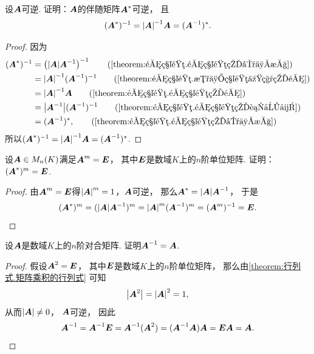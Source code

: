 \begin{example}\label{theorem:逆矩阵.伴随矩阵的逆与逆矩阵的伴随}
设\(\boldsymbol{A}\)可逆.
证明：\(\boldsymbol{A}\)的伴随矩阵\(\boldsymbol{A}^*\)可逆，
且\begin{equation}
	(\boldsymbol{A}^*)^{-1}
	= \abs{\boldsymbol{A}}^{-1} \boldsymbol{A}
	= (\boldsymbol{A}^{-1})^*.
\end{equation}
\begin{proof}
因为\begin{align*}
	(\vb{A}^*)^{-1}
	&= \left( \DeterminantA{\vb{A}} \vb{A}^{-1} \right)^{-1}
		\tag{\cref{theorem:逆矩阵.逆矩阵的唯一性}} \\
	&= \DeterminantA{\vb{A}}^{-1} (\vb{A}^{-1})^{-1}
		\tag{\cref{theorem:逆矩阵.数与矩阵乘积的逆}} \\
	&= \DeterminantA{\vb{A}}^{-1} \vb{A}
		\tag{\cref{theorem:逆矩阵.逆矩阵的逆}} \\
	&= \DeterminantA{\vb{A}^{-1}} (\vb{A}^{-1})^{-1}
		\tag{\cref{theorem:逆矩阵.逆矩阵的行列式}} \\
	&= (\vb{A}^{-1})^*,
		\tag{\cref{theorem:逆矩阵.逆矩阵的唯一性}}
\end{align*}
所以\((\boldsymbol{A}^*)^{-1}
= \abs{\boldsymbol{A}}^{-1} \boldsymbol{A}
= (\boldsymbol{A}^{-1})^*\).
\end{proof}
\end{example}
\begin{example}
设\(\boldsymbol{A} \in M_n(K)\)满足\(\boldsymbol{A}^m = \boldsymbol{E}\)，
其中\(\boldsymbol{E}\)是数域\(K\)上的\(n\)阶单位矩阵.
证明：\((\boldsymbol{A}^*)^m = \boldsymbol{E}\).
\begin{proof}
由\(\boldsymbol{A}^m = \boldsymbol{E}\)得\(\abs{\boldsymbol{A}}^m = 1\)，\(\boldsymbol{A}\)可逆，
那么\(\boldsymbol{A}^* = \abs{\boldsymbol{A}} \boldsymbol{A}^{-1}\)，
于是\begin{equation*}
	(\boldsymbol{A}^*)^m
	= (\abs{\boldsymbol{A}} \boldsymbol{A}^{-1})^m
	= \abs{\boldsymbol{A}}^m (\boldsymbol{A}^{-1})^m
	= (\boldsymbol{A}^m)^{-1}
	= \boldsymbol{E}.
	\qedhere
\end{equation*}
\end{proof}
\end{example}

\begin{example}\label{example:对合矩阵.对合矩阵的逆矩阵}
设\(\boldsymbol{A}\)是数域\(K\)上的\(n\)阶对合矩阵.
证明\(\boldsymbol{A}^{-1} = \boldsymbol{A}\).
\begin{proof}
假设\(\boldsymbol{A}^2=\boldsymbol{E}\)，
其中\(\boldsymbol{E}\)是数域\(K\)上的\(n\)阶单位矩阵，
那么由\cref{theorem:行列式.矩阵乘积的行列式} 可知\begin{equation*}
	\abs{\boldsymbol{A}^2}
	= \abs{\boldsymbol{A}}^2
	= 1,
\end{equation*}
从而\(\abs{\boldsymbol{A}}\neq0\)，
\(\boldsymbol{A}\)可逆，
因此\begin{equation*}
	\boldsymbol{A}^{-1}
	= \boldsymbol{A}^{-1}\boldsymbol{E}
	= \boldsymbol{A}^{-1}(\boldsymbol{A}^2)
	= (\boldsymbol{A}^{-1}\boldsymbol{A})\boldsymbol{A}
	= \boldsymbol{E}\boldsymbol{A}
	= \boldsymbol{A}.
	\qedhere
\end{equation*}
\end{proof}
\end{example}

